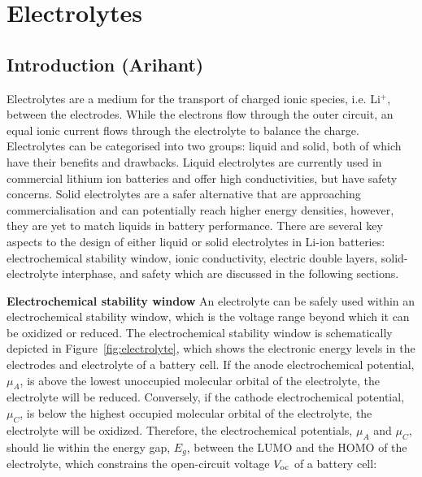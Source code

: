 \documentclass[../main.tex]{subfiles}
\begin{document}
\section{Electrolytes}
\label{sec:electrolytes}
\subsection{Introduction (Arihant)}
\label{sec:electrolytes_introduction}
Electrolytes are a medium for the transport of charged ionic species, i.e. Li$^+$, between the electrodes.\cite{Schmickler2010,Bard2010} While the electrons flow through the outer circuit, an equal ionic current flows through the electrolyte to balance the charge. Electrolytes can be categorised into two groups: liquid and solid, both of which have their benefits and drawbacks. Liquid electrolytes are currently used in commercial lithium ion batteries and offer high conductivities, but have safety concerns.\cite{kralisch2005energetic, smiglak2006combustible,ding2013effects} Solid electrolytes are a safer alternative that are approaching commercialisation and can potentially reach higher energy densities, however, they are yet to match liquids in battery performance. There are several key aspects to the design of either liquid or solid electrolytes in Li-ion batteries: electrochemical stability window,\cite{Goodenough2010, kazemiabnavi2016electrochemical} ionic conductivity,\cite{park2010review,Kamaya2011} electric double layers,\cite{Schmickler2010,Swift2021} solid-electrolyte interphase, \cite{Xu2011,Yu2017} and safety which are discussed in the following sections.\cite{Xu2004,Xu2014}

\textbf{Electrochemical stability window} An electrolyte can be safely used within an electrochemical stability window, which is the voltage range beyond which it can be oxidized or reduced.\cite{Goodenough2010} The electrochemical stability window is schematically depicted in Figure~\ref{fig:electrolyte}, which shows the electronic energy levels in the electrodes and electrolyte of a battery cell. If the anode electrochemical potential, $\mu_{A}$, is above the lowest unoccupied molecular orbital of the electrolyte, the electrolyte will be reduced. Conversely, if the cathode electrochemical potential, $\mu_{C}$, is below the highest occupied molecular orbital of the electrolyte, the electrolyte will be oxidized. Therefore, the electrochemical potentials, $\mu_{A}$ and $\mu_{C}$, should lie within the energy gap, $E_g$, between the LUMO and the HOMO of the electrolyte, which constrains the open-circuit voltage $V_{\rm oc}$ of a battery cell:\cite{Goodenough2010}
\end{document}
